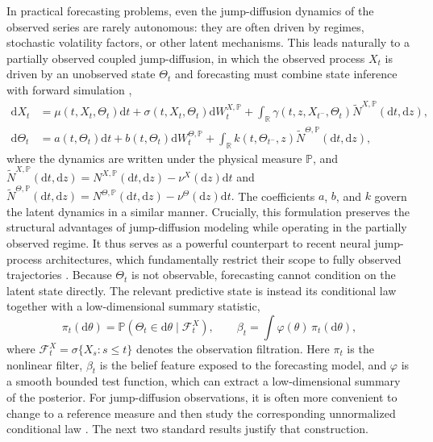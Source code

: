 \documentclass{article}
\newcommand{\R}{\mathbb{R}}
\newcommand{\dd}{\mathrm{d}}
\begin{document}
In practical forecasting problems, even the jump-diffusion dynamics of the observed series are rarely autonomous: they are often driven by regimes, stochastic volatility factors, or other latent mechanisms. This leads naturally to a partially observed coupled jump-diffusion, in which the observed process $X_t$ is driven by an unobserved state $\Theta_t$ and forecasting must combine state inference with forward simulation \citep{KurtzOcone1988FilteredMP,BandiniCossoFuhrmanPham2018-POC-BSDE},
\begin{align}
\dd X_t
&=
\mu\!\left(t,X_t,\Theta_t\right)\dd t
+ \sigma\!\left(t,X_t,\Theta_t\right)\dd W_t^{X,\mathbb P}
+ \int_{\R}\gamma\!\left(t,z,X_{t^-},\Theta_t\right)\widetilde N^{X,\mathbb P}(\dd t,\dd z),
\\
\dd \Theta_t
&=
a\!\left(t,\Theta_t\right)\dd t
+ b\!\left(t,\Theta_t\right)\dd W_t^{\Theta,\mathbb P}
+ \int_{\R}k\!\left(t,\Theta_{t^-},z\right)\widetilde N^{\Theta,\mathbb P}(\dd t,\dd z),
\label{eq:theta-dynamics}
\end{align}
where the dynamics are written under the physical measure $\mathbb P$, and $
\widetilde N^{X,\mathbb P}(\dd t,\dd z)=N^{X,\mathbb P}(\dd t,\dd z)-\nu^X(\dd z)\dd t$ and $
\widetilde N^{\Theta,\mathbb P}(\dd t,\dd z)=N^{\Theta,\mathbb P}(\dd t,\dd z)-\nu^\Theta(\dd z)\dd t.
$
The coefficients $a$, $b$, and $k$ govern the latent dynamics in a similar manner. Crucially, this formulation preserves the structural advantages of jump-diffusion modeling while operating in the partially observed regime. It thus serves as a powerful counterpart to recent neural jump-process architectures, which fundamentally restrict their scope to fully observed trajectories \citep{jia2019neural,zhang2024neural,gao2025neural}. Because $\Theta_t$ is not observable, forecasting cannot condition on the latent state directly. The relevant predictive state is instead its conditional law together with a low-dimensional summary statistic,
\begin{equation*}
\pi_t(\dd \theta)
=
\mathbb{P}\!\left(\Theta_t \in \dd \theta \mid \mathcal{F}_t^X\right),
\qquad
\beta_t
=
\int \varphi(\theta)\,\pi_t(\dd \theta),
\end{equation*}
where $\mathcal{F}_t^X=\sigma\{X_s:s\le t\}$ denotes the observation filtration. Here $\pi_t$ is the nonlinear filter, $\beta_t$ is the belief feature exposed to the forecasting model, and $\varphi$ is a smooth bounded test function, which can extract a low-dimensional summary of the posterior.
For jump-diffusion observations, it is often more convenient to change to a reference measure and then study the corresponding unnormalized conditional law \citep{KurtzOcone1988FilteredMP,CeciColaneri2014ZakaiJumps}. The next two standard results justify that construction.
\end{document}
